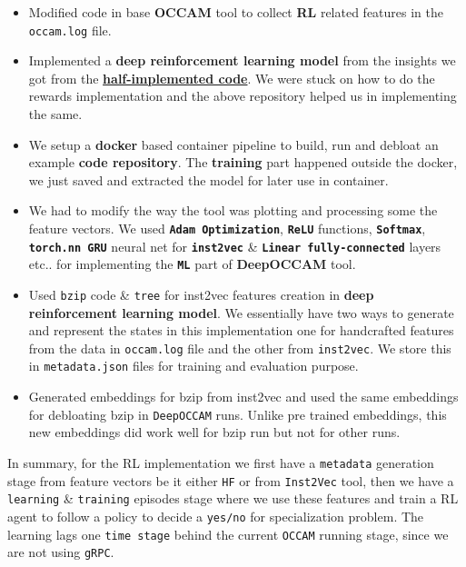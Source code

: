 \documentclass{relatorio}
\begin{document}
\begin{itemize}
	\item Modified code in base \textbf{OCCAM} tool to collect \textbf{RL} related features in the \texttt{occam.log} file. 
	\item Implemented a \textbf{deep reinforcement learning model} from the insights we got from the \textbf{\href{https://github.com/nhamlv-55/OCCAM/tree/mlpolicy}{half-implemented code}}. We were stuck on how to do the rewards implementation and the above repository helped us in implementing the same. 
	\item We setup a \textbf{docker} based container pipeline to build, run and debloat an example \textbf{\color{blue} code repository}. The \textbf{training} part happened outside the docker, we just saved and extracted the model for later use in container. 
	\item We had to modify the way the tool was plotting and processing some the feature vectors. We used \textbf{\texttt{Adam Optimization}}, \textbf{\texttt{ReLU}} functions, \textbf{\texttt{Softmax}}, \textbf{\texttt{torch.nn GRU}} neural net for \textbf{\texttt{inst2vec}} \& \textbf{\texttt{Linear fully-connected}} layers etc.. for implementing the \textbf{\texttt{ML}} part of \textbf{DeepOCCAM} tool.
	\item Used \texttt{bzip} code \& \texttt{tree} for inst2vec features creation in \textbf{deep reinforcement learning model}. We essentially have two ways to generate and represent the states in this implementation one for handcrafted features from the data in \texttt{occam.log} file and the other from \texttt{inst2vec}. We store this in \texttt{metadata.json} files for training and evaluation purpose. 
	\item Generated embeddings for bzip from inst2vec and used the same embeddings for debloating bzip in \texttt{DeepOCCAM} runs. Unlike pre trained embeddings, this new embeddings did work well for bzip run but not for other runs.   
\end{itemize}

In summary, for the RL implementation we first have a \texttt{metadata} generation stage from feature vectors be it either \texttt{HF} or from \texttt{Inst2Vec} tool, then we have a \texttt{learning} \& \texttt{training} episodes stage where we use these features and train a RL agent to follow a policy to decide a \texttt{yes/no} for specialization problem. The learning lags one \texttt{time stage} behind the current \texttt{OCCAM} running stage, since we are not using \texttt{gRPC}.   
\end{document}

